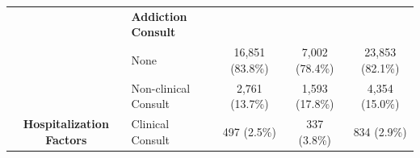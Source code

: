 \documentclass[useAMS,referee, usegraphicx]{biom}
\begin{document}
\begin{table}[H]
\begin{tabular}{clccc}
                                                    & { \textbf{Addiction Consult}}              &                                                      &                                                     &                                                       \\
                                                    & { None}                                    & { 16,851 (83.8\%)} & { 7,002 (78.4\%)} & { 23,853 (82.1\%)}  \\
                                                    & { Non-clinical Consult}                    & { 2,761 (13.7\%)}  & { 1,593 (17.8\%)} & { 4,354 (15.0\%)}   \\
\multirow{-10}{*}{\textbf{Hospitalization Factors}} & { Clinical Consult}                        & { 497 (2.5\%)}     & { 337 (3.8\%)}    & { 834 (2.9\%)}     \\ \bottomrule
\end{tabular}
\end{table}
\end{document}
